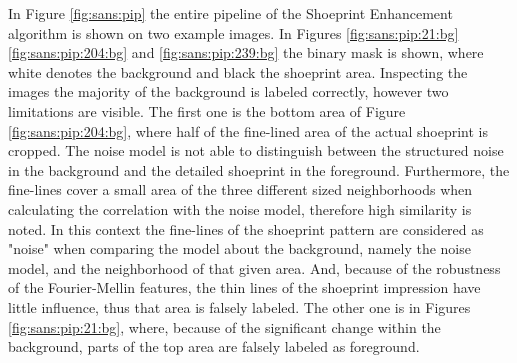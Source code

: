 \documentclass[draft,final]{vutinfth} %
\begin{document}
\par
In Figure \ref{fig:sans:pip} the entire pipeline of the Shoeprint Enhancement algorithm is shown on two example images.
In Figures  \ref{fig:sans:pip:21:bg} \ref{fig:sans:pip:204:bg} and \ref{fig:sans:pip:239:bg} the binary mask is shown, where white denotes the background and black the shoeprint area.
Inspecting the images the majority of the background is labeled correctly, however two limitations are visible.
The first one is the bottom area of Figure \ref{fig:sans:pip:204:bg}, where half of the fine-lined area of the actual shoeprint is cropped.
The noise model is not able to distinguish between the structured noise in the background and the detailed shoeprint in the foreground.
Furthermore, the fine-lines cover a small area of the three different sized neighborhoods when calculating the correlation with the noise model, therefore high similarity is noted.
In this context the fine-lines of the shoeprint pattern are considered as "noise" when comparing the model about the background, namely the noise model, and the neighborhood of that given area.
And, because of the robustness of the Fourier-Mellin features, the thin lines of the shoeprint impression have little influence, thus that area is falsely labeled.
The other one is in Figures \ref{fig:sans:pip:21:bg}, where, because of the significant change within the background, parts of the top area are falsely labeled as foreground.
\end{document}
